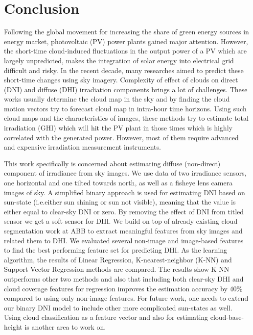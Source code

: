 \chapter{Conclusion}
\label{sec:conclusion_chapter}
Following the global movement for increasing the share of green energy sources in energy market, photovoltaic (PV) power plants gained major attention. However, the short-time cloud-induced fluctuations in the output power of a PV which are largely unpredicted, makes the integration of solar energy into electrical grid difficult and risky. In the recent decade, many researches aimed to predict these short-time changes using sky imagery. Complexity of effect of clouds on direct (DNI) and diffuse (DHI) irradiation components brings a lot of challenges. These works usually determine the cloud map in the sky and by finding the cloud motion vectors try to forecast cloud map in intra-hour time horizons. Using such cloud maps and the characteristics of images, these methods try to estimate total irradiation (GHI) which will hit the PV plant in those times which is highly correlated with the generated power. However, most of them require advanced and expensive irradiation measurement instruments.


This work specifically is concerned about estimating diffuse (non-direct) component of irradiance from sky images. We use data of two irradiance sensors, one horizontal and one tilted towards north, as well as a fisheye lens camera images of sky. A simplified binary approach is used for estimating DNI based on sun-state (i.e.either sun shining or sun not visible), meaning that the value is either equal to clear-sky DNI or zero. By removing the effect of DNI from titled sensor we get a soft sensor for DHI. We build on top of already existing cloud segmentation work at ABB to extract meaningful features from sky images and related them to DHI. We evaluated several non-image and image-based features to find the best performing feature set for predicting DHI. As the learning algorithm, the results of Linear Regression, K-nearest-neighbor (K-NN) and Support Vector Regression methods are compared. The results show K-NN outperforms other two methods and also that including both clear-sky DHI and cloud coverage features for regression improves the estimation accuracy by 40\% compared to using only non-image features. 
\newline
For future work, one needs to extend our binary DNI model to include other more complicated sun-states as well. Using cloud classification as a feature vector and also for estimating cloud-base-height is another area to work on.